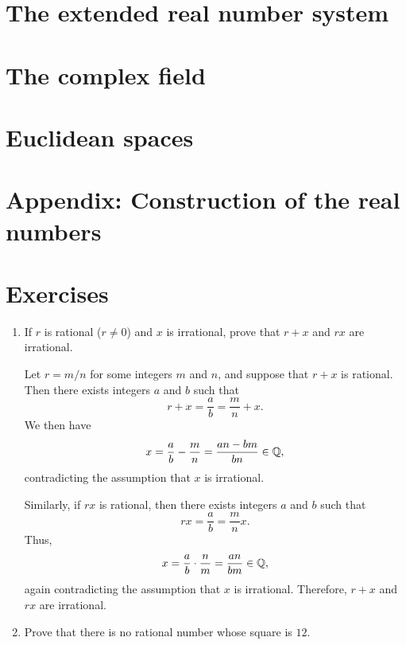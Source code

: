 \section*{The extended real number system}

\section*{The complex field}

\section*{Euclidean spaces}

\section*{Appendix: Construction of the real numbers}

\section*{Exercises}

\begin{enumerate}[label={\arabic*.}, wide, itemsep=1.5em]
    \item If \(r\) is rational (\(r \neq 0\)) and \(x\) is irrational, prove that \(r + x\) and \(rx\) are irrational.
    
    \begin{solution}
        Let \(r = m/n\) for some integers \(m\) and \(n\), and suppose that \(r + x\) is rational. Then there exists integers \(a\) and \(b\) such that
        \[
            r + x = \frac{a}{b} = \frac{m}{n} + x.
        \]
        We then have
        \[
            x = \frac{a}{b} - \frac{m}{n} = \frac{an - bm}{bn} \in \mathbb{Q},
        \]
        contradicting the assumption that \(x\) is irrational.

        Similarly, if \(rx\) is rational, then there exists integers \(a\) and \(b\) such that
        \[
            rx = \frac{a}{b} = \frac{m}{n}x.
        \]
        Thus,
        \[
            x = \frac{a}{b} \cdot \frac{n}{m} = \frac{an}{bm} \in \mathbb{Q},
        \]
        again contradicting the assumption that \(x\) is irrational. Therefore, \(r + x\) and \(rx\) are irrational.
    \end{solution}

    \item Prove that there is no rational number whose square is \(12\).
    \begin{solution}
        
    \end{solution}
\end{enumerate}
